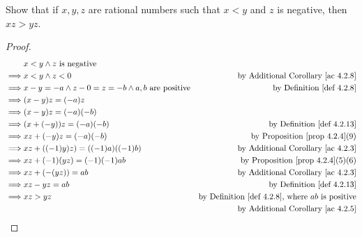 \begin{exercise}\label{exercise 4.2.6}
Show that if \(x, y, z\) are rational numbers such that \(x < y\) and \(z\) is negative, then \(xz > yz\).
\end{exercise}
\begin{proof}
\begin{align*}
                 & x < y \land z \text{ is negative} \\
        \implies & x < y \land z < 0 & \text{by \AC{4.2.8}} \\
        \implies & x - y = -a \land z - 0 = z = -b \land a, b \text{ are positive} & \text{by \DEF{4.2.8}}\\
        \implies & (x - y)z = (-a)z \\
        \implies & (x - y)z = (-a)(-b) \\
        \implies & (x + (-y))z = (-a)(-b) & \text{by \DEF{4.2.13}} \\
        \implies & xz + (-y)z = (-a)(-b) & \text{by \PROP{4.2.4}(9)} \\
        \implies & xz + ((-1)y)z) = ((-1)a)((-1)b) & \text{by \AC{4.2.3}} \\
        \implies & xz + (-1)(yz) = (-1)(-1)ab & \text{by \PROP{4.2.4}(5)(6)} \\
        \implies & xz + (-(yz)) = ab & \text{by \AC{4.2.3}} \\
        \implies & xz - yz = ab & \text{by \DEF{4.2.13}} \\
        \implies & xz > yz & \text{by \DEF{4.2.8}, where \(ab\) is positive} \\
                 &         & \text{by \AC{4.2.5}}
    \end{align*}
\end{proof}